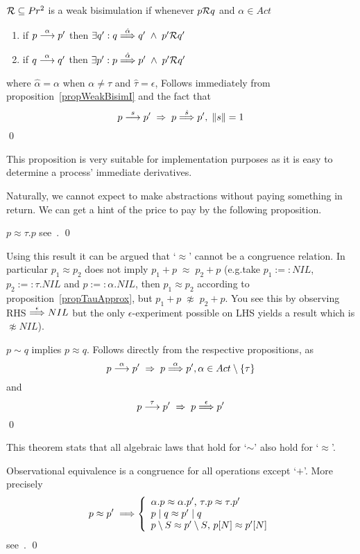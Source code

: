 \begin{proposition}\label{propWeakBisim}
${\cal R}\subseteq Pr^2$ is a weak bisimulation if whenever $p{\cal R}q$ and $\alpha\in Act$
\begin{enumerate}
\item if $p\stackrel{\alpha}{\longrightarrow}p'$ then $\exists q':q\stackrel{\hat{\alpha}}{\Longrightarrow}q'\;\wedge\; p'{\cal R}q'$
\item if $q\stackrel{\alpha}{\longrightarrow}q'$ then $\exists p':p\stackrel{\hat{\alpha}}{\Longrightarrow}p'\;\wedge\; p'{\cal R}q'$
\end{enumerate}
where $\hat{\alpha} = \alpha$ when $\alpha\not=\tau$ and $\hat{\tau} = \epsilon$,
\proof Follows immediately from proposition~\ref{propWeakBisimI} and the fact that
\[
p\stackrel{s}{\longrightarrow}p'\;\Rightarrow\;p\stackrel{\hat{s}}{\Longrightarrow}p',\; \|s\|=1
\]
\qed
\end{proposition}

\noindent
This proposition is very suitable for implementation purposes as it is easy to determine a process' immediate derivatives.

\noindent
Naturally, we cannot expect to make abstractions without paying something in return. We can get a hint of the price to pay by the following proposition.

\begin{proposition}\label{propTauApprox}
$p\approx\tau.p$
\proof see~\cite{Milner}.
\qed
\end{proposition}

\noindent
Using this result it can be argued that `$\approx$' cannot be a congruence relation. In particular $p_1\approx p_2$ does not imply $p_1+p\;\approx\;p_2+p$ (e.g.\@ take $p_1 :=: NIL$, $p_2 :=:  \tau.NIL$ and $p:=: \alpha.NIL$, then $p_1\approx p_2$ according to proposition~\ref{propTauApprox}, but $p_1+p\;\not\approx\; p_2+p$. You see this by observing RHS $\stackrel{\epsilon}{\Longrightarrow} NIL$ but the only $\epsilon$-experiment possible on LHS yields a result which is $\not\approx NIL$).

\begin{theorem}\label{theoSimImplyApprox}
$p\sim q$ implies $p\approx q$.
\proof Follows directly from the respective propositions, as
\[
p\stackrel{\alpha}{\longrightarrow}p'\;\Rightarrow\;p\stackrel{\alpha}{\Longrightarrow}p', \alpha\in Act\setminus \{\tau\}
\]
and
\[
p\stackrel{\tau}{\longrightarrow}p'\;\Rightarrow\;p\stackrel{\epsilon}{\Longrightarrow}p'
\]
\qed
\end{theorem}

\noindent
This theorem stats that all algebraic laws that hold for `$\sim$' also hold for `$\approx$'.

\begin{theorem}\label{theoObderCongruence}
Observational equivalence is a congruence for all operations except `$+$'. More precisely
\[
p\approx p'\;\Longrightarrow \left\{
\begin{array}{l}
\alpha.p\approx\alpha.p'\hbox{, }\tau.p\approx\tau.p'\\
p\mid q\approx p'\mid q\\
p\setminus S\approx p'\setminus S\hbox{, }p[N]\approx p'[N]
\end{array}
\right.
\]
\proof see~\cite{Milner}.
\qed
\end{theorem}

